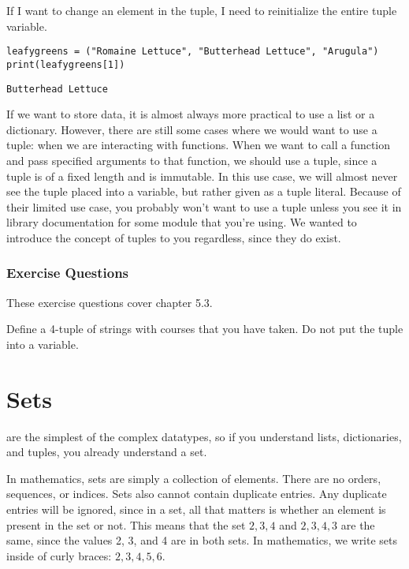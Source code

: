 If I want to change an element in the tuple, I need to reinitialize the entire tuple variable.\par
\begin{lstlisting}[style=pippython]
leafygreens = ("Romaine Lettuce", "Butterhead Lettuce", "Arugula")
print(leafygreens[1])
\end{lstlisting}
\begin{lstlisting}
Butterhead Lettuce
\end{lstlisting}
If we want to store data, it is almost always more practical to use a list or a dictionary. However, there are still some cases where we would want to use a tuple: when we are interacting with functions. When we want to call a function and pass specified arguments to that function, we should use a tuple, since a tuple is of a fixed length and is immutable. In this use case, we will almost never see the tuple placed into a variable, but rather given as a tuple literal. Because of their limited use case, you probably won't want to use a tuple unless you see it in library documentation for some module that you're using. We wanted to introduce the concept of tuples to you regardless, since they do exist.
\subsubsection*{Exercise Questions}
These exercise questions cover chapter 5.3.
\begin{Exercise}
\end{Exercise}
\begin{Exercise}
Define a 4-tuple of strings with courses that you have taken. Do not put the tuple into a variable.
\end{Exercise}

\section{Sets}
 are the simplest of the complex datatypes, so if you understand lists, dictionaries, and tuples, you already understand a set.\par
In mathematics, sets are simply a collection of elements. There are no orders, sequences, or indices. Sets also cannot contain duplicate entries. Any duplicate entries will be ignored, since in a set, all that matters is whether an element is present in the set or not. This means that the set ${2, 3, 4}$ and ${2, 3, 4, 3}$ are the same, since the values 2, 3, and 4 are in both sets. In mathematics, we write sets inside of curly braces: ${2, 3, 4, 5, 6}$.\par

